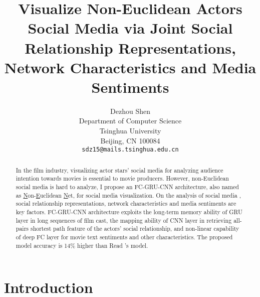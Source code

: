 \documentclass[review]{cvpr}
\begin{document}
\title{Visualize Non-Euclidean Actors Social Media via Joint Social Relationship Representations, Network Characteristics and Media Sentiments}

\author{Dezhou Shen\\
Department of Computer Science\\
Tsinghua University\\
Beijing, CN 100084\\
{\tt\small sdz15@mails.tsinghua.edu.cn}
}

\maketitle


\begin{abstract}

  In the film industry, visualizing actor stars' social media for analyzing audience intention towards movies is essential to movie producers.
  However, non-Euclidean social media is hard to analyze, I propose an FC-GRU-CNN architecture, also named as \underline{N}on-\underline{E}uclidean \underline{N}et, for social media visualization.
  On the analysis of social media , social relationship representations, network characteristics and media sentiments are key factors.
  FC-GRU-CNN architecture exploits the long-term memory ability of GRU layer in long sequences of film cast,
  the mapping ability of CNN layer in retrieving all-pairs shortest path feature of the actors' social relationship,
  and non-linear capability of deep FC layer for movie text sentiments and other characteristics.
  The proposed model accuracy is 14\% higher than Read \etal's model.

\end{abstract}

\section{Introduction}
\end{document}
